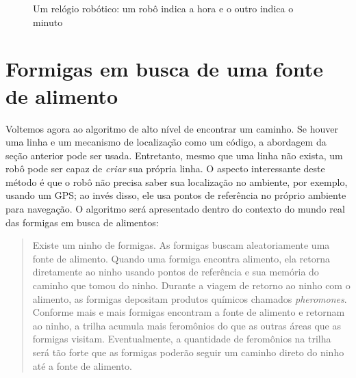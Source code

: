 \begin{figure}
\begin{center}
\end{center}
\caption{Um relógio robótico: um robô indica a hora e o outro indica o minuto}\label{fig.line-clock}
\end{figure}

\section{Formigas em busca de uma fonte de alimento}\label{s.ants}

Voltemos agora ao algoritmo de alto nível de encontrar um caminho. Se houver uma linha e um mecanismo de localização como um código, a abordagem da seção anterior pode ser usada. Entretanto, mesmo que uma linha não exista, um robô pode ser capaz de \emph{criar} sua própria linha. O aspecto interessante deste método é que o robô não precisa saber sua localização no ambiente, por exemplo, usando um GPS; ao invés disso, ele usa pontos de referência no próprio ambiente para navegação. O algoritmo será apresentado dentro do contexto do mundo real das formigas em busca de alimentos:

\begin{quote}
\normalsize Existe um ninho de formigas. As formigas buscam aleatoriamente uma fonte de alimento. Quando uma formiga encontra alimento, ela retorna diretamente ao ninho usando pontos de referência e sua memória do caminho que tomou do ninho. Durante a viagem de retorno ao ninho com o alimento, as formigas depositam produtos químicos chamados \emph{pheromones}. Conforme mais e mais formigas encontram a fonte de alimento e retornam ao ninho, a trilha acumula mais feromônios do que as outras áreas que as formigas visitam. Eventualmente, a quantidade de feromônios na trilha será tão forte que as formigas poderão seguir um caminho direto do ninho até a fonte de alimento.
\end{quote}

